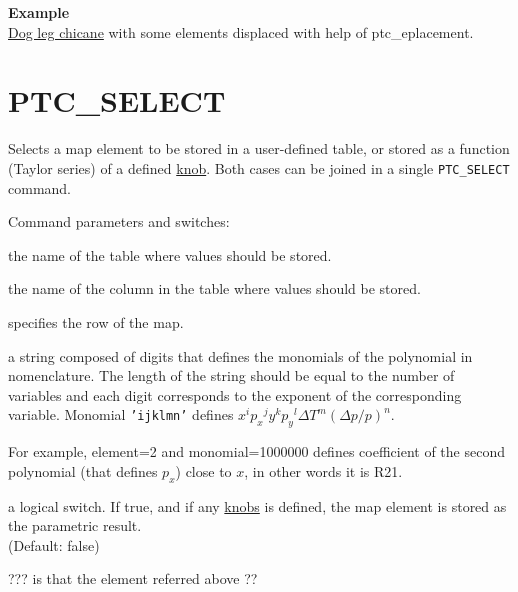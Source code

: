 {\bf Example }\\
\href{http://cern.ch/frs/mad-X_examples/ptc_madx_interface/eplacement/eplacement.madx}{Dog
  leg chicane} with some elements displaced with help of
ptc\_eplacement.

 
% 

\section{PTC\_SELECT}
\label{sec:ptc_select}

Selects a map element to be stored in a user-defined table, or stored as
a function (Taylor series) of a defined \hyperref[sec:ptc_knob]{knob}.
Both cases can be joined in a single {\tt PTC\_SELECT} command.  


Command parameters and switches: 
\begin{madlist}
    the name of the table where values should be
   stored. 

    the name of the column in the table where values
   should be stored.

    specifies the row of the map.   

    a string composed of digits that defines the
   monomials of the polynomial in \ptc nomenclature. The length of the
   string should be equal to the number of variables and each digit
   corresponds to the exponent of the corresponding variable. 
   Monomial {\tt 'ijklmn'} defines $x^i {p_x}^j y^k {p_y}^l \Delta T^m
   (\Delta p/p)^n$. 

   For example, element=2 and monomial=1000000 defines coefficient of
   the second polynomial (that defines $p_x$) close to $x$, in other
   words it is R21.   

    a logical switch. If true, and if any
   \hyperref[sec:ptc_knob]{knobs} is defined, the map element is stored
   as the parametric result. \\ (Default: false) 
   
    ??? is that the element referred above ??

\end{madlist}



